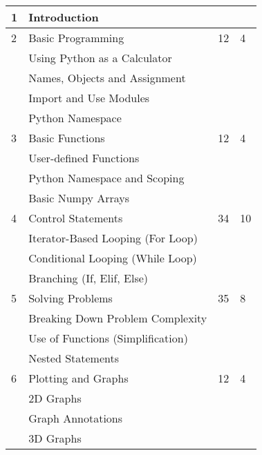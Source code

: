 \begin{longtable}{|p{2.0cm}|p{7.6cm}|p{2.0cm}|p{1.8cm}|}
             1  & Introduction                               &    &    \\
             \hline
             2  & Basic Programming                          & 12 & 4  \\
                & \qquad Using Python as a Calculator        &    &    \\
                & \qquad Names, Objects and Assignment       &    &    \\
                & \qquad Import and Use Modules              &    &    \\
                & \qquad Python Namespace                    &    &    \\
             \hline
             3  & Basic Functions                            & 12 & 4  \\
                & \qquad User-defined Functions              &    &    \\
                & \qquad Python Namespace and Scoping        &    &    \\
                & \qquad Basic Numpy Arrays                  &    &    \\
             \hline
             4  & Control Statements                         & 34 & 10 \\
                & \qquad Iterator-Based Looping (For Loop)   &    &    \\
                & \qquad Conditional Looping (While Loop)    &    &    \\
                & \qquad Branching (If, Elif, Else)          &    &    \\
             \hline
             5  & Solving Problems                           & 35 & 8  \\
                & \qquad Breaking Down Problem Complexity    &    &    \\
                & \qquad Use of Functions (Simplification)   &    &    \\
                & \qquad Nested Statements                   &    &    \\
             \hline
             6  & Plotting and Graphs                        & 12 & 4  \\
                & \qquad 2D Graphs                           &    &    \\
                & \qquad Graph Annotations                   &    &    \\
                & \qquad 3D Graphs                           &    &    \\

\end{longtable}
